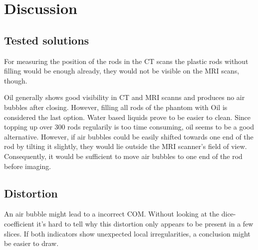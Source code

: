 
\chapter{Discussion}


\section{Tested solutions}

For measuring the position of the rods in the CT scans the plastic rods without filling would be enough already, they would not be visible on the MRI scans, though.

Oil generally shows good visibility in CT and MRI scanns and produces no air bubbles after closing.
However, filling all rods of the phantom with Oil is considered the last option. Water based liquids prove to be easier to clean.
Since topping up over 300 rods regularily is too time consuming, oil seems to be a good alternative.
However, if air bubbles could be easily shifted towards one end of the rod by tilting it slightly, they would lie outside the MRI scanner's field of view.
Consequently, it would be sufficient to move air bubbles to one end of the rod before imaging.


\section{Distortion}
An air bubble might lead to a incorrect COM. Without looking at the dice-coefficient it's hard to tell why this distortion only appears to be present in a few slices.
If both indicators show unexpected local irregularities, a conclusion might be easier to draw.
